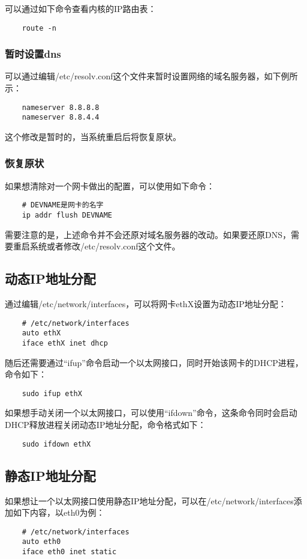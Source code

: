 \documentclass[a4paper,left=2.5cm,right=2.5cm,11pt]{article}
\begin{document}
	可以通过如下命令查看内核的IP路由表：
	\begin{lstlisting}
	route -n
	\end{lstlisting}

\subsubsection{暂时设置dns}
	可以通过编辑/etc/resolv.conf这个文件来暂时设置网络的域名服务器，如下例所示：
	\begin{lstlisting}
	nameserver 8.8.8.8
	nameserver 8.8.4.4
	\end{lstlisting}

	这个修改是暂时的，当系统重启后将恢复原状。

\subsubsection{恢复原状}
	如果想清除对一个网卡做出的配置，可以使用如下命令：
	\begin{lstlisting}
	# DEVNAME是网卡的名字
	ip addr flush DEVNAME
	\end{lstlisting}

	需要注意的是，上述命令并不会还原对域名服务器的改动。如果要还原DNS，需要重启系统或者修改/etc/resolv.conf这个文件。

\subsection{动态IP地址分配}
	通过编辑/etc/network/interfaces，可以将网卡ethX设置为动态IP地址分配：
	\begin{lstlisting}
	# /etc/network/interfaces
	auto ethX
	iface ethX inet dhcp
	\end{lstlisting}

	随后还需要通过“ifup”命令启动一个以太网接口，同时开始该网卡的DHCP进程，命令如下：
	\begin{lstlisting}
	sudo ifup ethX
	\end{lstlisting}

	如果想手动关闭一个以太网接口，可以使用“ifdown”命令，这条命令同时会启动DHCP释放进程关闭动态IP地址分配，命令格式如下：
	\begin{lstlisting}
	sudo ifdown ethX
	\end{lstlisting}

\subsection{静态IP地址分配}
	如果想让一个以太网接口使用静态IP地址分配，可以在/etc/network/interfaces添加如下内容，以eth0为例：
	\begin{lstlisting}
	# /etc/network/interfaces
	auto eth0
	iface eth0 inet static
	\end{lstlisting}
\end{document}

